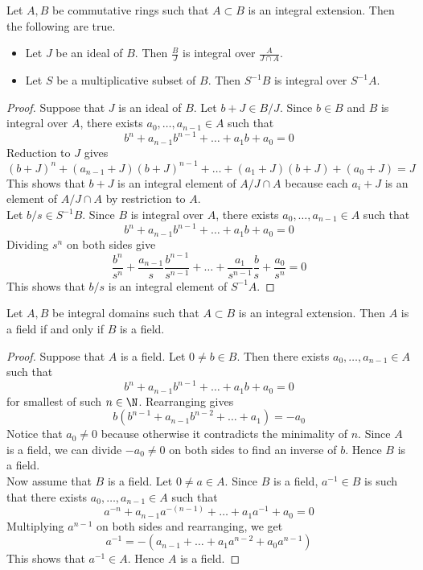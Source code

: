 \documentclass[a4paper]{article}
\begin{document}
\begin{prp}{}{} Let $A,B$ be commutative rings such that $A\subset B$ is an integral extension. Then the following are true. 
\begin{itemize}
\item Let $J$ be an ideal of $B$. Then $\frac{B}{J}$ is integral over $\frac{A}{J\cap A}$. 
\item Let $S$ be a multiplicative subset of $B$. Then $S^{-1}B$ is integral over $S^{-1}A$. 
\end{itemize} 
\begin{proof}
Suppose that $J$ is an ideal of $B$. Let $b+J\in B/J$. Since $b\in B$ and $B$ is integral over $A$, there exists $a_0,\dots,a_{n-1}\in A$ such that $$b^n+a_{n-1}b^{n-1}+\dots+a_1b+a_0=0$$ Reduction to $J$ gives $$(b+J)^n+(a_{n-1}+J)(b+J)^{n-1}+\dots+(a_1+J)(b+J)+(a_0+J)=J$$ This shows that $b+J$ is an integral element of $A/J\cap A$ because each $a_i+J$ is an element of $A/J\cap A$ by restriction to $A$. \\

Let $b/s\in S^{-1}B$. Since $B$ is integral over $A$, there exists $a_0,\dots,a_{n-1}\in A$ such that $$b^n+a_{n-1}b^{n-1}+\dots+a_1b+a_0=0$$ Dividing $s^n$ on both sides give $$\frac{b^n}{s^n}+\frac{a_{n-1}}{s}\frac{b^{n-1}}{s^{n-1}}+\dots+\frac{a_1}{s^{n-1}}\frac{b}{s}+\frac{a_0}{s^n}=0$$ This shows that $b/s$ is an integral element of $S^{-1}A$. 
\end{proof}
\end{prp}

\begin{lmm}{}{} Let $A,B$ be integral domains such that $A\subset B$ is an integral extension. Then $A$ is a field if and only if $B$ is a field. 
\begin{proof}
Suppose that $A$ is a field. Let $0\neq b\in B$. Then there exists $a_0,\dots,a_{n-1}\in A$ such that $$b^n+a_{n-1}b^{n-1}+\dots+a_1b+a_0=0$$ for smallest of such $n\in\N$. Rearranging gives $$b(b^{n-1}+a_{n-1}b^{n-2}+\dots+a_1)=-a_0$$ Notice that $a_0\neq 0$ because otherwise it contradicts the minimality of $n$. Since $A$ is a field, we can divide $-a_0\neq 0$ on both sides to find an inverse of $b$. Hence $B$ is a field. \\

Now assume that $B$ is a field. Let $0\neq a\in A$. Since $B$ is a field, $a^{-1}\in B$ is such that there exists $a_0,\dots,a_{n-1}\in A$ such that $$a^{-n}+a_{n-1}a^{-(n-1)}+\dots+a_1a^{-1}+a_0=0$$ Multiplying $a^{n-1}$ on both sides and rearranging, we get $$a^{-1}=-\left(a_{n-1}+\dots+a_1a^{n-2}+a_0a^{n-1}\right)$$ This shows that $a^{-1}\in A$. Hence $A$ is a field. 
\end{proof}
\end{lmm}
\end{document}
